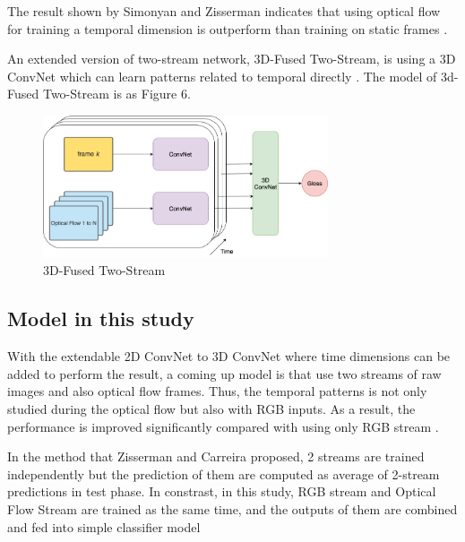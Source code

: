 \documentclass[a4paper, 12pt]{article}
\begin{document}
The result shown by Simonyan and Zisserman indicates that using optical flow for training a temporal dimension is outperform than training on static frames \citep{karpathy2014large}.

An extended version of two-stream network, 3D-Fused Two-Stream, is using a 3D ConvNet which can learn patterns related to temporal directly \citep{carreira2017quo}. The model of 3d-Fused Two-Stream is as Figure 6.

\begin{figure}[H]
    \centering
    \includegraphics[width=0.75\textwidth]{3D-Fused Two-stream.png}
    \caption{3D-Fused Two-Stream}
    \label{Figure 6}
\end{figure}

\subsection{Model in this study}
With the extendable 2D ConvNet to 3D ConvNet where time dimensions can be added to perform the result, a coming up model is that use two streams of raw images and also optical flow frames. Thus, the temporal patterns is not only studied during the optical flow but also with RGB inputs. As a result, the performance is improved significantly compared with using only RGB stream \citep{carreira2017quo}.

In the method that Zisserman and Carreira proposed, 2 streams are trained independently but the prediction of them are computed as average of 2-stream predictions in test phase. In constrast, in this study, RGB stream and Optical Flow Stream are trained as the same time, and the outputs of them are combined and fed into simple classifier model
\end{document}
